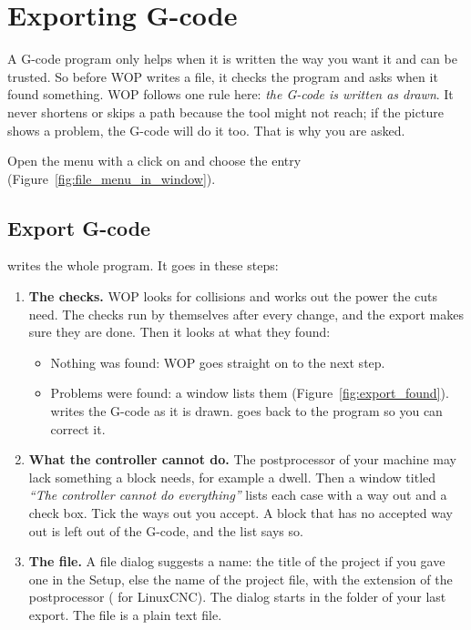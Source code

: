 \section{Exporting G-code}\label{sec:file:export}

A G-code program only helps when it is written the way you want it and can be trusted. So before WOP writes a file, it checks the program and asks when it found something. WOP follows one rule here: \emph{the G-code is written as drawn}. It never shortens or skips a path because the tool might not reach; if the picture shows a problem, the G-code will do it too. That is why you are asked.

Open the menu with a click on  and choose the entry (Figure~\ref{fig:file_menu_in_window}).


\subsection{Export G-code}
 writes the whole program. It goes in these steps:

\begin{enumerate}
  \item \textbf{The checks.} WOP looks for collisions and works out the power the cuts need. The checks run by themselves after every change, and the export makes sure they are done. Then it looks at what they found:
  \begin{itemize}
    \item Nothing was found: WOP goes straight on to the next step.
    \item Problems were found: a window lists them (Figure~\ref{fig:export_found}).  writes the G-code as it is drawn.  goes back to the program so you can correct it.
  \end{itemize}
  \item \textbf{What the controller cannot do.} The postprocessor of your machine may lack something a block needs, for example a dwell. Then a window titled \emph{``The controller cannot do everything''} lists each case with a way out and a check box. Tick the ways out you accept. A block that has no accepted way out is left out of the G-code, and the list says so.
  \item \textbf{The file.} A file dialog suggests a name: the title of the project if you gave one in the Setup, else the name of the project file, with the extension of the postprocessor ( for LinuxCNC). The dialog starts in the folder of your last export. The file is a plain text file.
\end{enumerate}

